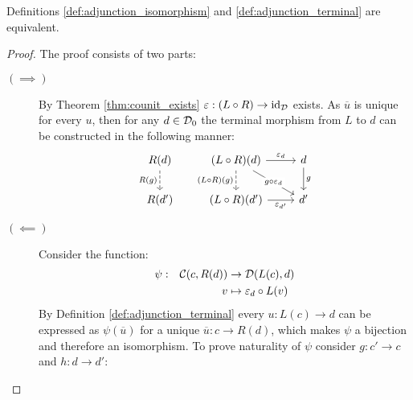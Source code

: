 \begin{theorem}
  Definitions \ref{def:adjunction_isomorphism} and \ref{def:adjunction_terminal}
  are equivalent.

  \begin{proof}
    The proof consists of two parts:
    \begin{description}
      \item[$(\implies)$] By Theorem \ref{thm:counit_exists} $\varepsilon:(L\circ
        R) \to \mathrm{id}_{\mathcal{D}}$ exists. As $\overline{u}$ is unique for every $u$, then for
        any $d\in\mathcal{D}_0$ the terminal morphism from $L$ to $d$ can be constructed
        in the following manner:
        \[\begin{tikzcd}[ampersand replacement=\&] {R(d)} \& {(L\circ R)(d)} \&
          d \\
          {R(d')} \& {(L\circ R)(d')} \& {d'}
          \arrow["{\epsilon_d}", from=1-2, to=1-3]
          \arrow["{\epsilon_{d'}}"', from=2-2, to=2-3]
          \arrow["g", from=1-3, to=2-3]
          \arrow["{R(g)}"', dashed, from=1-1, to=2-1]
          \arrow["{g\circ \epsilon_d}"{description}, from=1-2, to=2-3]
          \arrow["{(L\circ R)(g)}"', dashed, from=1-2, to=2-2]
        \end{tikzcd}\]
      \item[$(\impliedby)$] Consider the function:
        \[
          \begin{aligned}
            \psi:&&\mathcal{C}(c, R(d)) &\to \mathcal{D}(L(c), d)\\
            &&v&\mapsto \varepsilon_d\circ L(v)
          \end{aligned}
        \]
        By Definition \ref{def:adjunction_terminal} every $u:L(c)\to d$ can be
        expressed as $\psi(\overline{u})$ for a unique $\overline{u}:c\to R(d)$,
        which makes $\psi$ a bijection and therefore an isomorphism. To prove
        naturality of $\psi$ consider $g:c'\to c$ and $h:d\to d'$:

\end{description}
\end{proof}
\end{theorem}
